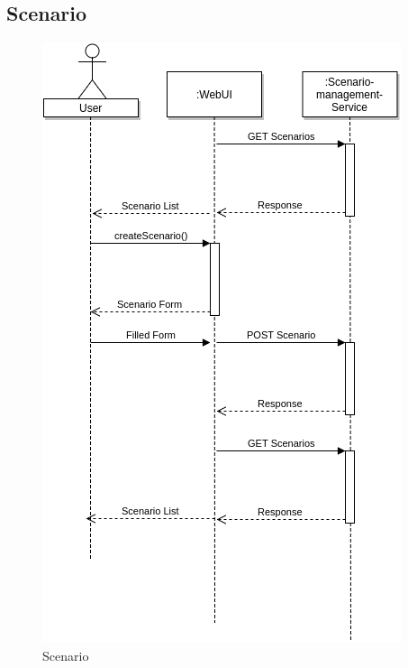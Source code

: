 \subsection{Scenario}
\begin{figure}[H]
	\centering\includegraphics[width=.75\textwidth]{res/Scenario}
	\caption{Scenario}
	\label{fig:scenario}
\end{figure}

